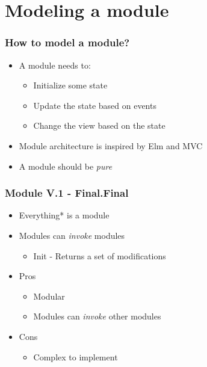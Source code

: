 \section{Modeling a module}
\SectionPage

\begin{frame}
  \frametitle{How to model a module?}
  \begin{itemize}
    \item A module needs to:
      \pause
      \begin{itemize}
        \item Initialize some state
        \pause
        \item Update the state based on events
        \pause
        \item Change the view based on the state
      \end{itemize}
      \pause
    \item Module architecture is inspired by Elm and MVC
      \pause
    \item A module should be \textit{pure}
  \end{itemize}
\end{frame}

\begin{frame}
  \frametitle{Module V.1 - Final.Final}
  \begin{itemize}
    \item Everything* is a module
      \pause
    \item Modules can \textit{invoke} modules
      \pause
    \begin{itemize}
      \item Init - Returns a set of modifications
    \end{itemize}
    \pause
    \item Pros
    \pause
    \begin{itemize}
      \item Modular
        \pause
      \item Modules can \textit{invoke} other modules
    \end{itemize}
    \pause
    \item Cons
    \begin{itemize}
        \pause
      \item Complex to implement
    \end{itemize}
  \end{itemize}
\end{frame}

\hidelogo


